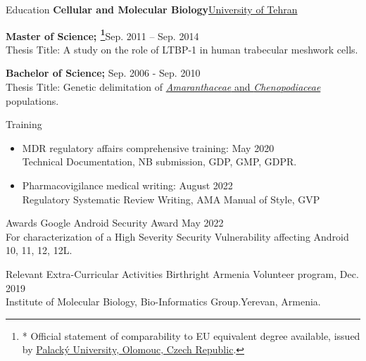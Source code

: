 \documentclass{resume}
\begin{document}
\begin{rSection}{Education}
\textbf{Cellular and Molecular Biology}\hfill {\href{https://science.ut.ac.ir/en/web/biology}{University of Tehran}}

{\bf Master of Science; \let\thefootnote\relax\footnote{* Official statement of comparability to EU equivalent degree available, issued by \href{https://www.upol.cz/en/}{Palacký University, Olomouc, Czech Republic}.}}\hfill {Sep. 2011 -- Sep. 2014}\\
 Thesis Title: A study on the role of LTBP-1 in human trabecular meshwork cells.
 
{\bf Bachelor of Science;} \hfill {Sep. 2006 - Sep. 2010}\\
 Thesis Title: Genetic delimitation of \href{https://onlinelibrary.wiley.com/doi/abs/10.1111/boj.12015}{\textit{Amaranthaceae} and \textit{Chenopodiaceae}} populations.
 
\end{rSection}

\begin{rSection}{Training}
    \begin{itemize}
        \itemsep -2.22pt {}
         \item MDR regulatory affairs comprehensive training: \hfill May 2020\\
         Technical Documentation, NB submission, GDP, GMP, GDPR.
         \item Pharmacovigilance medical writing: \hfill August 2022\\
         Regulatory Systematic Review Writing, AMA Manual of Style, GVP
    \end{itemize}
\end{rSection}

\begin{rSection}{Awards}
Google Android Security Award \hfill May 2022\\
For characterization of a High Severity Security Vulnerability affecting Android 10, 11, 12, 12L.
\end{rSection}

\begin{rSection}{Relevant Extra-Curricular Activities} 
    Birthright Armenia Volunteer program, \hfill Dec. 2019\\
    Institute of Molecular Biology, Bio-Informatics Group.\hfill Yerevan, Armenia.\\


\end{rSection}
\end{document}
